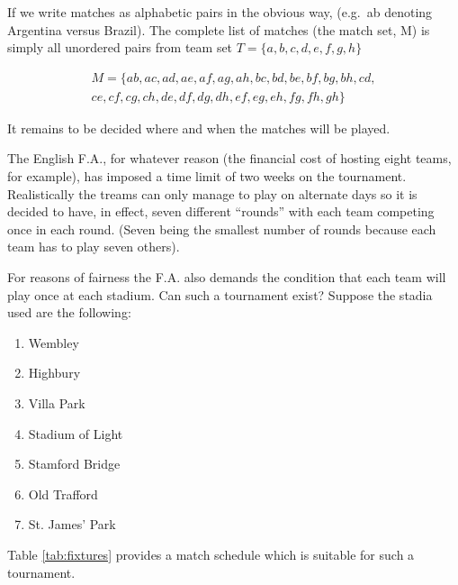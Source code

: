 \documentclass[
  11pt,
  a4paper]{book}
\newcounter{example}
\begin{document}
If we write matches as alphabetic pairs in the obvious way, (e.g.~ab
denoting Argentina versus Brazil). The complete list of matches (the
match set, M) is simply all unordered pairs from team set
\(T = \{a, b, c, d, e, f, g, h\}\)

\begin{equation*}
  \begin{split}
    M = \{
      ab, ac, ad, ae, af, ag, ah, bc, bd, be, bf, bg, bh, cd, \\
      ce, cf, cg, ch, de, df, dg, dh, ef, eg, eh, fg, fh, gh
    \}
  \end{split}
\end{equation*}

It remains to be decided where and when the matches will be played.

The English F.A., for whatever reason (the financial cost of hosting
eight teams, for example), has imposed a time limit of two weeks on the
tournament. Realistically the treams can only manage to play on
alternate days so it is decided to have, in effect, seven different
``rounds'' with each team competing once in each round. (Seven being the
smallest number of rounds because each team has to play seven others).

For reasons of fairness the F.A. also demands the condition that each
team will play once at each stadium. Can such a tournament exist?
Suppose the stadia used are the following:

\begin{enumerate}
  \item{Wembley}
  \item{Highbury}
  \item{Villa Park}
  \item{Stadium of Light}
  \item{Stamford Bridge}
  \item{Old Trafford}
  \item{St. James' Park}
\end{enumerate}

Table \ref{tab:fixtures} provides a match schedule which is suitable for
such a tournament.
\end{document}
